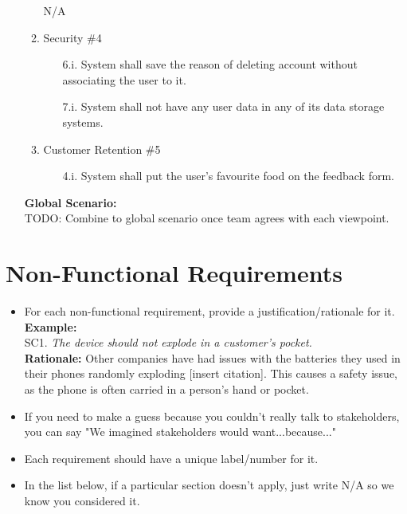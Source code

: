 \documentclass[]{article}
\begin{document}
\begin{enumerate}[{\bf BE1.}]
\begin{enumerate}[{\bf VP1.}]
				N/A
			\item Security \#4 
				\begin{enumerate}
					\item [6.i.] System shall save the reason of deleting account without associating the user to it.
					\item [7.i.] System shall not have any user data in any of its data storage systems.
				\end{enumerate}
			\item Customer Retention \#5
				\begin{enumerate}
					\item[4.i.] System shall put the user's favourite food on the feedback form.
				\end{enumerate}
		\end{enumerate}

		{\bf Global Scenario:} \\
		TODO: Combine to global scenario once team agrees with each viewpoint.
		
\end{enumerate}


\section{Non-Functional Requirements}
\label{sec:non-functional_requirements}


\begin{itemize}
	\item For each non-functional requirement, provide a justification/rationale for it.\\
	{\bf Example:} \\
	SC1. \emph{The device should not explode in a customer’s pocket.}\\
	{\bf Rationale:} Other companies have had issues with the batteries they used in their phones randomly exploding [insert citation]. This causes a safety issue, as the phone is often carried in a person's hand or pocket.	
	\item If you need to make a guess because you couldn't really talk to stakeholders, you can say "We imagined stakeholders would want...because..."
	\item Each requirement should have a unique label/number for it.
	\item In the list below, if a particular section doesn't apply, just write N/A so we know you considered it.
\end{itemize}
\end{document}
